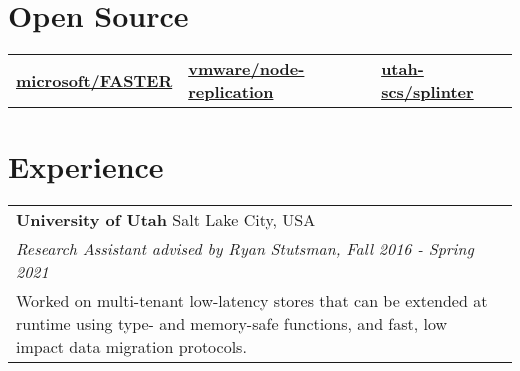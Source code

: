 \documentclass[margin,line]{res}
\begin{document}
\begin{resume}



\section{\sc Open Source}
\begin{tabular}{@{}p{2in}p{2in}p{2in}}
\href{{https://github.com/microsoft/FASTER}}{{\bf microsoft/FASTER}}
&
%
\href{{https://github.com/vmware/node-replication}}{{\bf vmware/node-replication}}
&
%
\href{{https://github.com/utah-scs/splinter}}
{{\bf utah-scs/splinter}}
\end{tabular}

\section{\sc Experience}
\begin{tabular}{@{}p{5.5in}p{4in}}
{\bf University of Utah} \dotfill Salt Lake City, USA\\
{\small\em Research Assistant advised by Ryan Stutsman, Fall 2016 -
Spring 2021}\\
{\small Worked on multi-tenant low-latency stores that can
be extended at runtime using type- and memory-safe functions,
and fast,
low impact data migration protocols.}
\end{tabular}


\end{resume}
\end{document}

